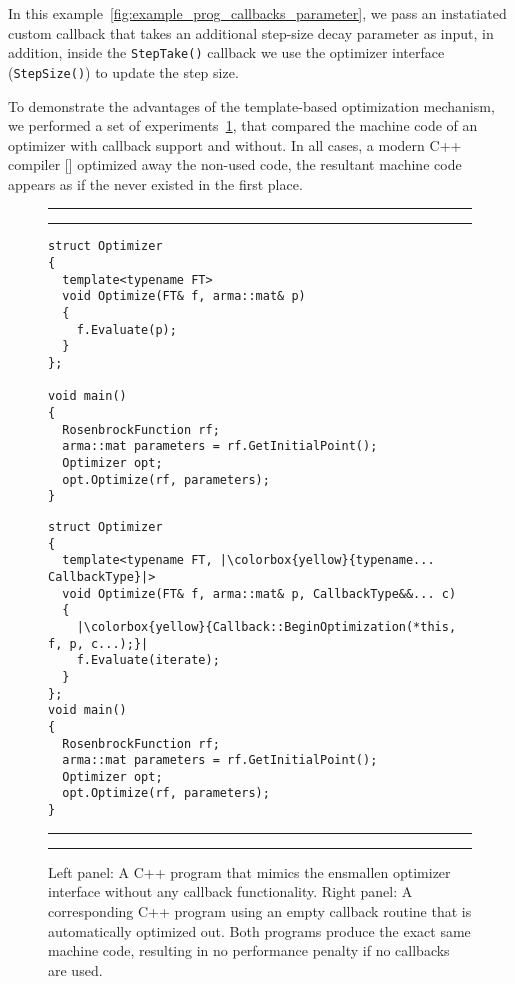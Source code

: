 In this example~\ref{fig:example_prog_callbacks_parameter}, we pass an
instatiated custom callback that takes an additional step-size decay parameter
as input, in addition, inside the {\tt StepTake()} callback we use the optimizer
interface ({\tt StepSize()}) to update the step size.

To demonstrate the advantages of the template-based optimization mechanism, we
performed a set of experiments~\ref{fig:callback_compilter_opt}, that compared
the machine code of an optimizer with callback support and without. In all
cases, a modern C++ compiler [] optimized away the non-used code, the resultant
machine code appears as if the never existed in the first place.

\begin{figure}[H]
\centering
\hrule
\hrule
\vspace{0.5ex}
\begin{minipage}{0.45\textwidth}
\begin{verbatim}
struct Optimizer
{
  template<typename FT>
  void Optimize(FT& f, arma::mat& p)
  {
    f.Evaluate(p);
  }
};

void main()
{
  RosenbrockFunction rf;
  arma::mat parameters = rf.GetInitialPoint();
  Optimizer opt;
  opt.Optimize(rf, parameters);
}

\end{verbatim}
\end{minipage}
%
\hfill
\vline
\vline
\hfill
%
\begin{minipage}{0.45\textwidth}
\begin{verbatim}
struct Optimizer
{
  template<typename FT, |\colorbox{yellow}{typename... CallbackType}|>
  void Optimize(FT& f, arma::mat& p, CallbackType&&... c)
  {
    |\colorbox{yellow}{Callback::BeginOptimization(*this, f, p, c...);}|
    f.Evaluate(iterate);
  }
};
void main()
{
  RosenbrockFunction rf;
  arma::mat parameters = rf.GetInitialPoint();
  Optimizer opt;
  opt.Optimize(rf, parameters);
}
\end{verbatim}
\end{minipage}
\vspace{0.5ex}
\hrule
\hrule
\caption
  {
  Left panel: A C++ program that mimics the ensmallen optimizer interface
  without any callback functionality. Right panel: A corresponding C++ program
  using an empty callback routine that is automatically optimized out. Both
  programs produce the exact same machine code, resulting in no performance
  penalty if no callbacks are used.
  }
\label{fig:callback_compilter_opt}
\end{figure}

